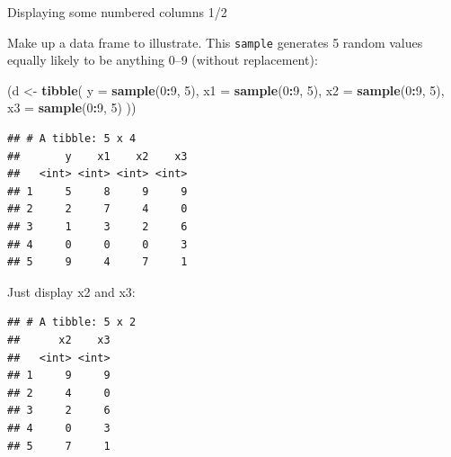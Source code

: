 \documentclass[ignorenonframetext,]{beamer}
\newenvironment{Shaded}{\begin{snugshade}}{\end{snugshade}}
\newcommand{\DataTypeTok}[1]{\textcolor[rgb]{0.13,0.29,0.53}{#1}}
\newcommand{\DecValTok}[1]{\textcolor[rgb]{0.00,0.00,0.81}{#1}}
\newcommand{\KeywordTok}[1]{\textcolor[rgb]{0.13,0.29,0.53}{\textbf{#1}}}
\newcommand{\NormalTok}[1]{#1}
\newcommand{\OperatorTok}[1]{\textcolor[rgb]{0.81,0.36,0.00}{\textbf{#1}}}
\newcommand{\StringTok}[1]{\textcolor[rgb]{0.31,0.60,0.02}{#1}}
\begin{document}
\begin{frame}[fragile]{Displaying some numbered columns 1/2}
\protect\hypertarget{displaying-some-numbered-columns-12}{}

Make up a data frame to illustrate. This \texttt{sample} generates 5
random values equally likely to be anything 0--9 (without replacement):

\begin{Shaded}
\begin{Highlighting}[]
\NormalTok{(d <-}\StringTok{ }\KeywordTok{tibble}\NormalTok{(}
  \DataTypeTok{y =} \KeywordTok{sample}\NormalTok{(}\DecValTok{0}\OperatorTok{:}\DecValTok{9}\NormalTok{, }\DecValTok{5}\NormalTok{),}
  \DataTypeTok{x1 =} \KeywordTok{sample}\NormalTok{(}\DecValTok{0}\OperatorTok{:}\DecValTok{9}\NormalTok{, }\DecValTok{5}\NormalTok{),}
  \DataTypeTok{x2 =} \KeywordTok{sample}\NormalTok{(}\DecValTok{0}\OperatorTok{:}\DecValTok{9}\NormalTok{, }\DecValTok{5}\NormalTok{),}
  \DataTypeTok{x3 =} \KeywordTok{sample}\NormalTok{(}\DecValTok{0}\OperatorTok{:}\DecValTok{9}\NormalTok{, }\DecValTok{5}\NormalTok{)}
\NormalTok{))}
\end{Highlighting}
\end{Shaded}

\begin{verbatim}
## # A tibble: 5 x 4
##       y    x1    x2    x3
##   <int> <int> <int> <int>
## 1     5     8     9     9
## 2     2     7     4     0
## 3     1     3     2     6
## 4     0     0     0     3
## 5     9     4     7     1
\end{verbatim}

\end{frame}

\begin{frame}[fragile]{Just display x2 and x3:}
\protect\hypertarget{just-display-x2-and-x3}{}

\begin{Shaded}
\end{Shaded}

\begin{verbatim}
## # A tibble: 5 x 2
##      x2    x3
##   <int> <int>
## 1     9     9
## 2     4     0
## 3     2     6
## 4     0     3
## 5     7     1
\end{verbatim}

\end{frame}
\end{document}
